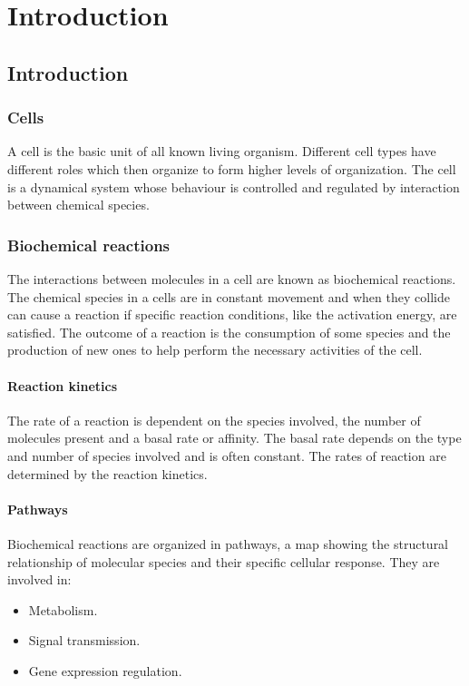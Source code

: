 \graphicspath{{chapters/01/images/}}
\chapter{Introduction}

\section{Introduction}

  \subsection{Cells}
  A cell is the basic unit of all known living organism.
  Different cell types have different roles which then organize to form higher levels of organization.
  The cell is a dynamical system whose behaviour is controlled and regulated by interaction between chemical species.

  \subsection{Biochemical reactions}
  The interactions between molecules in a cell are known as biochemical reactions.
  The chemical species in a cells are in constant movement and when they collide can cause a reaction if specific reaction conditions, like the activation energy, are satisfied.
  The outcome of a reaction is the consumption of some species and the production of new ones to help perform the necessary activities of the cell.

    \subsubsection{Reaction kinetics}
    The rate of a reaction is dependent on the species involved, the number of molecules present and a basal rate or affinity.
    The basal rate depends on the type and number of species involved and is often constant.
    The rates of reaction are determined by the reaction kinetics.

    \subsubsection{Pathways}
    Biochemical reactions are organized in pathways, a map showing the structural relationship of molecular species and their specific cellular response.
    They are involved in:

    \begin{multicols}{2}
      \begin{itemize}
        \item Metabolism.
        \item Signal transmission.
        \item Gene expression regulation.
      \end{itemize}
    \end{multicols}

